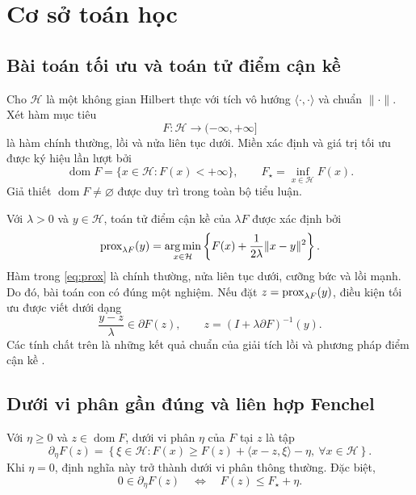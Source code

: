 \section{Cơ sở toán học}

\subsection{Bài toán tối ưu và toán tử điểm cận kề}

Cho $\mathcal{H}$ là một không gian Hilbert thực với tích vô hướng $\langle\cdot,\cdot\rangle$ và chuẩn $\|\cdot\|$. Xét hàm mục tiêu
\[
F:\mathcal{H}\longrightarrow(-\infty,+\infty]
\]
là hàm chính thường, lồi và nửa liên tục dưới. Miền xác định và giá trị tối ưu được ký hiệu lần lượt bởi
\[
\operatorname{dom}F=\{x\in\mathcal{H}:F(x)<+\infty\},
\qquad
F_{\star}=\inf_{x\in\mathcal{H}}F(x).
\]
Giả thiết $\operatorname{dom}F\neq\varnothing$ được duy trì trong toàn bộ tiểu luận.

Với $\lambda>0$ và $y\in\mathcal{H}$, toán tử điểm cận kề của $\lambda F$ được xác định bởi
\begin{equation}
\operatorname{prox}_{\lambda F}(y)
=\operatorname*{arg\,min}_{x\in\mathcal{H}}
\left\{F(x)+\frac{1}{2\lambda}\|x-y\|^2\right\}.
\label{eq:prox}
\end{equation}
Hàm trong \eqref{eq:prox} là chính thường, nửa liên tục dưới, cưỡng bức và lồi mạnh. Do đó, bài toán con có đúng một nghiệm. Nếu đặt $z=\operatorname{prox}_{\lambda F}(y)$, điều kiện tối ưu được viết dưới dạng
\begin{equation}
\frac{y-z}{\lambda}\in\partial F(z),
\qquad
z=(I+\lambda\partial F)^{-1}(y).
\label{eq:prox-opt}
\end{equation}
Các tính chất trên là những kết quả chuẩn của giải tích lồi và phương pháp điểm cận kề \cite{rockafellar1976,beck2017,ryuyin2023}.

\subsection{Dưới vi phân gần đúng và liên hợp Fenchel}

Với $\eta\geq0$ và $z\in\operatorname{dom}F$, dưới vi phân $\eta$ của $F$ tại $z$ là tập
\begin{equation}
\partial_{\eta}F(z)
=\left\{\xi\in\mathcal{H}:F(x)\geq F(z)+\langle x-z,\xi\rangle-\eta,
\ \forall x\in\mathcal{H}\right\}.
\label{eq:eps-subdiff}
\end{equation}
Khi $\eta=0$, định nghĩa này trở thành dưới vi phân thông thường. Đặc biệt,
\[
0\in\partial_{\eta}F(z)
\quad\Longleftrightarrow\quad
F(z)\leq F_{\star}+\eta.
\]

